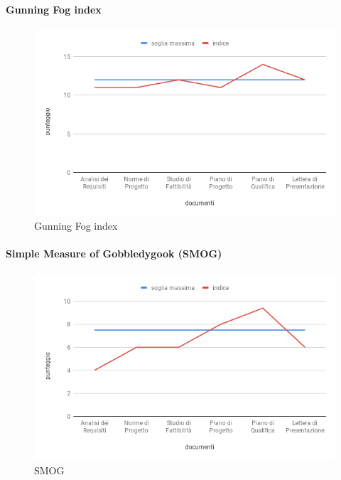 \paragraph{Gunning Fog index}
\hspace{15cm}
\begin{figure}[!htbp]
	\centering
	\includegraphics[scale=0.5]{GunningFogIndex.png}
	\caption{Gunning Fog index}

\end{figure}
\paragraph{Simple Measure of Gobbledygook (SMOG)}
\hspace{15cm}
\begin{figure}[!htbp]
	\centering
	\includegraphics[scale=0.5]{Smog.png}
	\caption{SMOG}
\end{figure}
\clearpage
